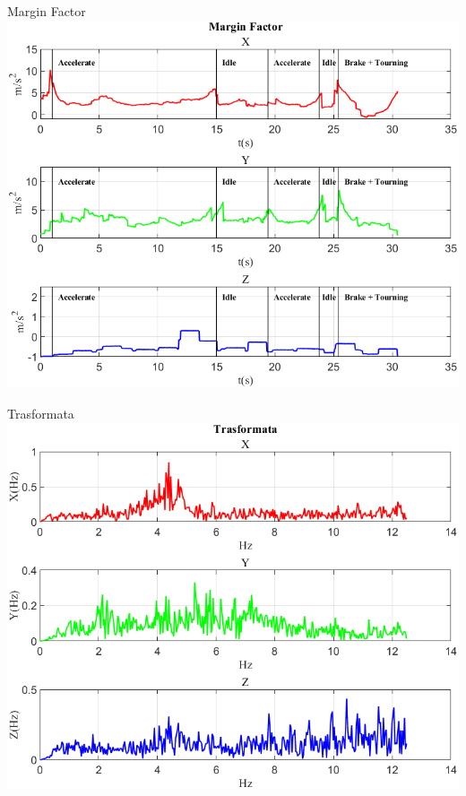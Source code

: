 \documentclass[beamer]{standalone}
\begin{document}
	\begin{frame}{{Margin Factor}}
		\centering\includegraphics[height=.8\textheight]{figure/Acc/Margin Factor}
	\end{frame}
	
	\begin{frame}{{Trasformata}}
		\centering\includegraphics[height=.8\textheight]{figure/Acc/Trasformata/Trasformata}
	\end{frame}
	
\end{document}
